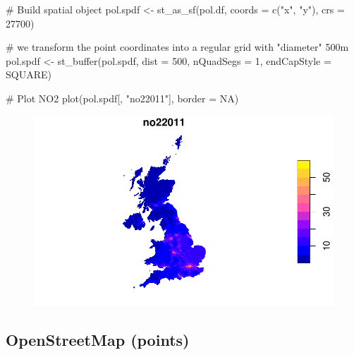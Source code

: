\documentclass[
  letterpaper,
]{scrbook}
\newenvironment{Shaded}{\begin{snugshade}}{\end{snugshade}}
\newcommand{\AttributeTok}[1]{\textcolor[rgb]{0.40,0.45,0.13}{#1}}
\newcommand{\CommentTok}[1]{\textcolor[rgb]{0.37,0.37,0.37}{#1}}
\newcommand{\ConstantTok}[1]{\textcolor[rgb]{0.56,0.35,0.01}{#1}}
\newcommand{\DecValTok}[1]{\textcolor[rgb]{0.68,0.00,0.00}{#1}}
\newcommand{\FunctionTok}[1]{\textcolor[rgb]{0.28,0.35,0.67}{#1}}
\newcommand{\NormalTok}[1]{\textcolor[rgb]{0.00,0.23,0.31}{#1}}
\newcommand{\OtherTok}[1]{\textcolor[rgb]{0.00,0.23,0.31}{#1}}
\newcommand{\StringTok}[1]{\textcolor[rgb]{0.13,0.47,0.30}{#1}}
\begin{document}
\begin{Shaded}
\begin{Highlighting}[]
\CommentTok{\# Build spatial object}
\NormalTok{pol.spdf }\OtherTok{\textless{}{-}} \FunctionTok{st\_as\_sf}\NormalTok{(pol.df, }\AttributeTok{coords =} \FunctionTok{c}\NormalTok{(}\StringTok{"x"}\NormalTok{, }\StringTok{"y"}\NormalTok{),}
                    \AttributeTok{crs =} \DecValTok{27700}\NormalTok{)}

\CommentTok{\# we transform the point coordinates into a regular grid with "diameter" 500m}
\NormalTok{pol.spdf }\OtherTok{\textless{}{-}} \FunctionTok{st\_buffer}\NormalTok{(pol.spdf, }\AttributeTok{dist =} \DecValTok{500}\NormalTok{, }\AttributeTok{nQuadSegs  =} \DecValTok{1}\NormalTok{,}
                      \AttributeTok{endCapStyle =} \StringTok{\textquotesingle{}SQUARE\textquotesingle{}}\NormalTok{)}

\CommentTok{\# Plot NO2}
\FunctionTok{plot}\NormalTok{(pol.spdf[, }\StringTok{"no22011"}\NormalTok{], }\AttributeTok{border =} \ConstantTok{NA}\NormalTok{)}
\end{Highlighting}
\end{Shaded}

\begin{figure}[H]

{\centering \includegraphics{01_refresher_files/figure-pdf/unnamed-chunk-16-1.pdf}

}

\end{figure}

\hypertarget{openstreetmap-points}{%
\subsection{OpenStreetMap (points)}\label{openstreetmap-points}}
\end{document}
